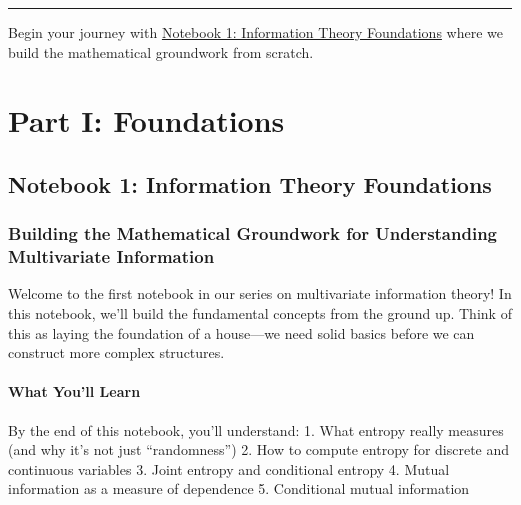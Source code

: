 \documentclass[
  11pt,
  letterpaper,
  oneside,
  openany]{book}
\begin{document}
\begin{center}\rule{0.5\linewidth}{0.5pt}\end{center}

\begin{tcolorbox}[enhanced jigsaw, coltitle=black, breakable, colframe=quarto-callout-tip-color-frame, bottomrule=.15mm, colbacktitle=quarto-callout-tip-color!10!white, title=\textcolor{quarto-callout-tip-color}{\faLightbulb}\hspace{0.5em}{Ready to Start?}, opacitybacktitle=0.6, bottomtitle=1mm, toptitle=1mm, arc=.35mm, left=2mm, colback=white, rightrule=.15mm, titlerule=0mm, leftrule=.75mm, toprule=.15mm, opacityback=0]

Begin your journey with
\href{01_information_theory_foundations.ipynb}{Notebook 1: Information
Theory Foundations} where we build the mathematical groundwork from
scratch.

\end{tcolorbox}

\part{Part I: Foundations}

\chapter{Notebook 1: Information Theory
Foundations}\label{notebook-1-information-theory-foundations}

\section{Building the Mathematical Groundwork for Understanding
Multivariate
Information}\label{building-the-mathematical-groundwork-for-understanding-multivariate-information}

Welcome to the first notebook in our series on multivariate information
theory! In this notebook, we'll build the fundamental concepts from the
ground up. Think of this as laying the foundation of a house---we need
solid basics before we can construct more complex structures.

\subsection{What You'll Learn}\label{what-youll-learn-1}

By the end of this notebook, you'll understand: 1. What entropy really
measures (and why it's not just ``randomness'') 2. How to compute
entropy for discrete and continuous variables 3. Joint entropy and
conditional entropy 4. Mutual information as a measure of dependence 5.
Conditional mutual information
\end{document}
